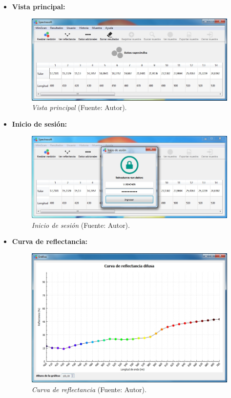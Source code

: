  \begin{itemize}
 	
 	\item \textbf{Vista principal:}
 	
 		\begin{figure}[H]
		\centering
		\includegraphics[scale=0.6]{img/vista-principal.jpg}
			\caption[Vista principal]{\textit{Vista principal} (Fuente: Autor).}
	\end{figure}
	
	 	\item \textbf{Inicio de sesi\'{o}n:}
 	
 		\begin{figure}[H]
		\centering
		\includegraphics[scale=0.6]{img/vista-inicio-sesion.jpg}
			\caption[Inicio de sesi\'{o}n]{\textit{Inicio de sesi\'{o}n} (Fuente: Autor).}
	\end{figure}

\newpage
	 	\item \textbf{Curva de reflectancia:}
 	
 		\begin{figure}[H]
		\centering
		\includegraphics[scale=0.4]{img/vista-reflectancia.jpg}
			\caption[Curva de reflectancia]{\textit{Curva de reflectancia} (Fuente: Autor).}
	\end{figure}
	

\end{itemize}
